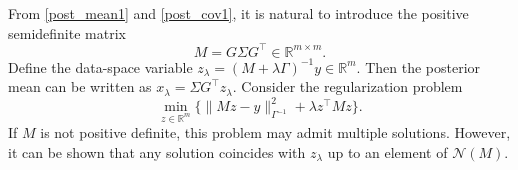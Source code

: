 \documentclass[]{myarticle}
\begin{document}
From \cref{post_mean1} and \cref{post_cov1}, it is natural to introduce the positive semidefinite matrix 
\begin{equation}\label{def_M}
  M = G\Sigma G^\top \in \mathbb R^{m\times m}.
\end{equation}
Define the data-space variable $z_\lambda =(M+\lambda\Gamma)^{-1}y\in\mathbb{R}^{m}$. Then the posterior mean can be written as $x_\lambda = \Sigma G^\top z_\lambda$. Consider the regularization problem
\begin{equation}\label{regu_data}
  \min_{z\in\mathbb{R}^{m}}\{\|Mz-y\|_{\Gamma^{-1}}^2 + \lambda z^{\top}Mz \}.
\end{equation}
If $M$ is not positive definite, this problem may admit multiple solutions. However, it can be shown that any solution coincides with $z_\lambda$ up to an element of $\mathcal{N}(M)$.
\end{document}
